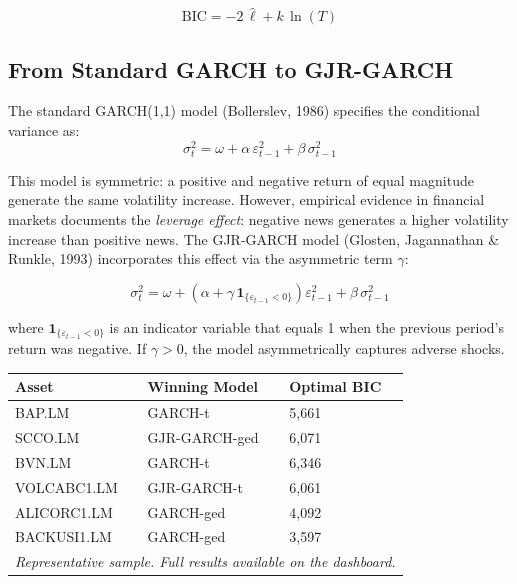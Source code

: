 \documentclass[11pt,a4paper]{article}
\begin{document}
\begin{equation}
    \text{BIC} = -2\,\hat{\ell} + k\,\ln(T)
\end{equation}

\subsection{From Standard GARCH to GJR-GARCH}

The standard GARCH(1,1) model (Bollerslev, 1986) specifies the conditional variance as:
\begin{equation}
    \sigma^2_t = \omega + \alpha\,\varepsilon^2_{t-1} + \beta\,\sigma^2_{t-1}
\end{equation}

This model is symmetric: a positive and negative return of equal magnitude generate the
same volatility increase. However, empirical evidence in financial markets documents the
\textit{leverage effect}: negative news generates a higher volatility increase than positive news.
The GJR-GARCH model (Glosten, Jagannathan \& Runkle, 1993) incorporates this effect via the asymmetric term $\gamma$:

\begin{equation}
    \sigma^2_t = \omega + \left(\alpha + \gamma\,\mathbf{1}_{\{\varepsilon_{t-1}<0\}}\right)\varepsilon^2_{t-1} + \beta\,\sigma^2_{t-1}
\end{equation}

where $\mathbf{1}_{\{\varepsilon_{t-1}<0\}}$ is an indicator variable that equals 1 when the
previous period's return was negative. If $\gamma > 0$, the model asymmetrically captures adverse shocks.

\begin{center}
\begin{tabular}{lll}
\toprule
\rowcolor{lightgray}
\textbf{Asset} & \textbf{Winning Model} & \textbf{Optimal BIC} \\
\midrule
BAP.LM     & GARCH-t         & 5,661 \\
SCCO.LM    & GJR-GARCH-ged   & 6,071 \\
BVN.LM     & GARCH-t         & 6,346 \\
VOLCABC1.LM & GJR-GARCH-t     & 6,061 \\
ALICORC1.LM & GARCH-ged       & 4,092 \\
BACKUSI1.LM & GARCH-ged       & 3,597 \\
\bottomrule
\multicolumn{3}{l}{\small\textit{Representative sample. Full results available on the dashboard.}}
\end{tabular}
\end{center}
\end{document}
